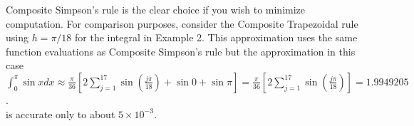 \documentclass[12pt,a4paper]{article}
\begin{document}
Composite Simpson's rule is the clear choice if you wish to minimize computation. For comparison purposes, consider the Composite Trapezoidal rule using $h=\pi / 18$ for the integral in Example 2. This approximation uses the same function evaluations as Composite Simpson's rule but the approximation in this case\\
$\int_{0}^{\pi} \sin x d x \approx \frac{\pi}{36}\left[2 \sum_{j=1}^{17} \sin \left(\frac{j \pi}{18}\right)+\sin 0+\sin \pi\right]=\frac{\pi}{36}\left[2 \sum_{j=1}^{17} \sin \left(\frac{j \pi}{18}\right)\right]=1.9949205$.\\
is accurate only to about $5 \times 10^{-3}$.\\
%
%
%
%
%
%
%
%
%
\end{document}
